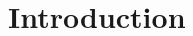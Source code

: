 \documentclass[12pt,a4paper]{article}
\begin{document}
\setcounter{page}{1} 
%

%
%
%
%
%
%
%
%





	
	\begin{doublespace}
		\tableofcontents
	\end{doublespace}


	\newpage
	
	
	
	
	
	\section{Introduction} \label{sec:1}
	
	
	
	
	
	
	
	\newpage
	\begin{spacing}{0.9}
		\printbibliography
	\end{spacing}
	
	
	
	
	
	
	
	
\end{document}
